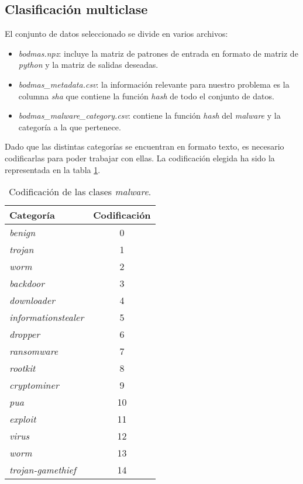 \subsection{Clasificación multiclase}
\label{subsec:multiclass}

El conjunto de datos seleccionado se divide en varios archivos:

\begin{itemize}
	\item \textit{bodmas.npz}: incluye la matriz de patrones de entrada en formato de matriz de \textit{python} y la matriz de salidas deseadas.
	\item \textit{bodmas\_metadata.csv}: la información relevante para nuestro problema es la columna \textit{sha} que contiene la función \textit{hash} de todo el conjunto de datos.
	\item \textit{bodmas\_malware\_category.csv}: contiene la función \textit{hash} del \textit{malware} y la categoría a la que pertenece.
\end{itemize}

Dado que las distintas categorías se encuentran en formato texto, es necesario codificarlas para poder trabajar con ellas. La codificación elegida ha sido la representada en la tabla \ref{tabla:codificacion_malware}.

\vspace{1em}

\begin{table}[th]
	\centering
	\begin{tabular}{ |m{4cm}|c| }
		\hline
		\rowcolor{LightCyan}
		Categoría                   & Codificación \\
		\hline
		\textit{benign}             & 0            \\
		\textit{trojan}             & 1            \\
		\textit{worm}               & 2            \\
		\textit{backdoor}           & 3            \\
		\textit{downloader}         & 4            \\
		\textit{informationstealer} & 5            \\
		\textit{dropper}            & 6            \\
		\textit{ransomware}         & 7            \\
		\textit{rootkit}            & 8            \\
		\textit{cryptominer}        & 9            \\
		\textit{pua}                & 10           \\
		\textit{exploit}            & 11           \\
		\textit{virus}              & 12           \\
		\textit{worm}               & 13           \\
		\textit{trojan-gamethief}   & 14           \\
		\hline
	\end{tabular}
	\caption{Codificación de las clases \textit{malware}.}
	\label{tabla:codificacion_malware}
\end{table}

